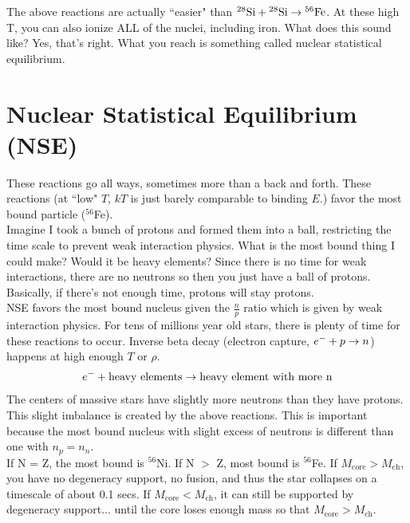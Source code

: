 The above reactions are actually ``easier" than $\textrm{$^{28}$Si} +\textrm{$^{28}$Si} \rightarrow \textrm{$^{56}$Fe} $. At these high T, you can also ionize ALL of the nuclei, including iron. What does this sound like? Yes, that's right. What you reach is something called nuclear statistical equilibrium.

\section{Nuclear Statistical Equilibrium (NSE)}

These reactions go all ways, sometimes more than a back and forth. These reactions (at ``low" $T$, $kT$ is just barely comparable to binding $E$.) favor the most bound particle ($^{56}$Fe). \\
\indent Imagine I took a bunch of protons and formed them into a ball, restricting the time scale to prevent weak interaction physics. What is the most bound thing I could make? Would it be heavy elements? Since there is no time for weak interactions, there are no neutrons so then you just have a ball of protons. Basically, if there's not enough time, protons will stay protons. \\
\indent NSE favors the most bound nucleus given the $\frac{n}{p}$ ratio which is given by weak interaction physics. For tens of millions year old stars, there is plenty of time for these reactions to occur. Inverse beta decay (electron capture, $e^- + p \rightarrow n$) happens at high enough $T$ or $\rho$.
\begin{align}
e^- + \textrm{heavy elements} \rightarrow \textrm{heavy element with more n}
\end{align}
The centers of massive stars have slightly more neutrons than they have protons. This slight imbalance is created by the above reactions. This is important because the most bound nucleus with slight excess of neutrons is different than one with $n_p = n_n$. \\
\indent If N = Z, the most bound is $^{56}$Ni. If N $>$ Z, most bound is $^{56}$Fe. If $M_{\textrm{core}}> M_{\textrm{ch}}$, you have no degeneracy support, no fusion, and thus the star collapses on a timescale of about 0.1 secs. If $M_{\textrm{core}} < M_{\textrm{ch}}$, it can still be supported by degeneracy support... until the core loses enough mass so that $M_{\textrm{core}}> M_{\textrm{ch}}$.